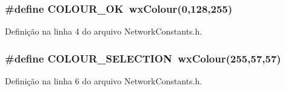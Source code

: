 \subsubsection[{C\+O\+L\+O\+U\+R\+\_\+\+OK}]{\setlength{\rightskip}{0pt plus 5cm}\#define C\+O\+L\+O\+U\+R\+\_\+\+OK~wx\+Colour(0,128,255)}\label{_network_constants_8h_aee9f0f94e5ba476cfbfc9d1723e45ce7}


Definição na linha 4 do arquivo Network\+Constants.\+h.

\subsubsection[{C\+O\+L\+O\+U\+R\+\_\+\+S\+E\+L\+E\+C\+T\+I\+ON}]{\setlength{\rightskip}{0pt plus 5cm}\#define C\+O\+L\+O\+U\+R\+\_\+\+S\+E\+L\+E\+C\+T\+I\+ON~wx\+Colour(255,57,57)}\label{_network_constants_8h_a2bc7d69b5da64c7113cbf00ccdef169f}


Definição na linha 6 do arquivo Network\+Constants.\+h.

